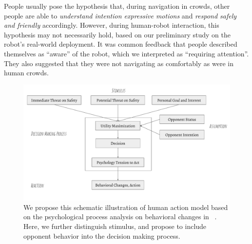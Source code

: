 \documentclass[conference]{IEEEtran}
\begin{document}



People usually pose the hypothesis that, during navigation in crowds, other 
people are able to \textit{understand intention expressive motions} and \textit{respond safely 
and friendly} 
accordingly. However, during human-robot interaction, this hypothesis may not 
necessarily hold, based on our preliminary study on the robot's real-world 
deployment. It was common feedback that people described themselves as 
``aware'' of the robot, which we interpreted as ``requiring attention''. They 
also suggested that they were not navigating as 
comfortably as were in human crowds.
\begin{figure}[tb]
  \begin{center}
  \hspace*{-2em}
    \includegraphics[width=1.05\columnwidth]{images/behavior_change.pdf}
  \hspace*{-2em}
  \vspace*{-1.5em}
  \end{center}
  \vspace{-0.05in}
  \caption{We propose this schematic illustration of human action model based 
    on the psychological process analysis on behavioral changes in ~\cite{helbing1995social}.
    Here, we further distinguish stimulus, and propose to include opponent 
    behavior into the decision making process.}
\vspace{-0.05in}
\label{fig:behavior}
\end{figure}
\vspace{-.3em}
\end{document}
